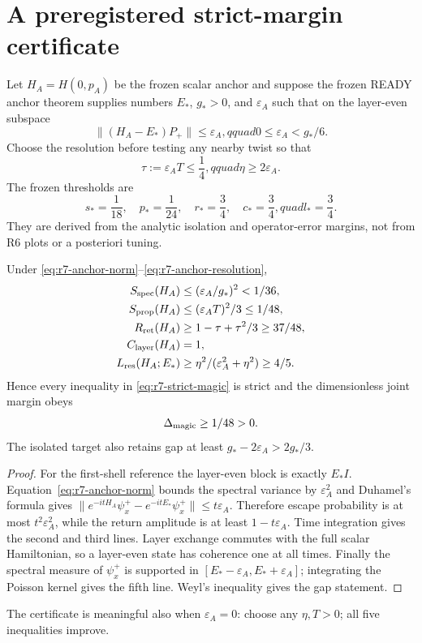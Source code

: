 \section{A preregistered strict-margin certificate}
\label{sec:r7-margin}

Let $H_A=H(0,p_A)$ be the frozen scalar anchor and suppose the frozen READY
anchor theorem supplies numbers $E_*$, $g_*>0$, and $\varepsilon_A$ such that
on the layer-even subspace
\begin{equation}
 \|(H_A-E_*)P_+\|\le\varepsilon_A,qquad
 0\le\varepsilon_A<g_*/6.
 \label{eq:r7-anchor-norm}
\end{equation}
Choose the resolution before testing any nearby twist so that
\begin{equation}
 \tau:=\varepsilon_A T\le\frac14,qquad
 \eta\ge2\varepsilon_A.
 \label{eq:r7-anchor-resolution}
\end{equation}
The frozen thresholds are
\begin{equation}
 s_*=\frac1{18},\quad p_*=\frac1{24},\quad r_*=\frac34,
 \quad c_*=\frac34,quad l_*=\frac34.
 \label{eq:r7-thresholds}
\end{equation}
They are derived from the analytic isolation and operator-error margins, not
from R6 plots or a posteriori tuning.

\begin{proposition}
\label{prop:r7-anchor-margin}
Under \eqref{eq:r7-anchor-norm}--\eqref{eq:r7-anchor-resolution},
\begin{align}
 S_{\rm spec}(H_A)&\le(\varepsilon_A/g_*)^2<1/36,\\
 S_{\rm prop}(H_A)&\le(\varepsilon_AT)^2/3\le1/48,\\
 R_{\rm ret}(H_A)&\ge1-\tau+\tau^2/3\ge37/48,\\
 C_{\rm layer}(H_A)&=1,\\
 L_{\rm res}(H_A;E_*)&\ge
 \eta^2/(\varepsilon_A^2+\eta^2)\ge4/5.
 \label{eq:r7-anchor-five}
\end{align}
Hence every inequality in \eqref{eq:r7-strict-magic} is strict and the
dimensionless joint margin obeys
\begin{equation}\Delta_{\rm magic}\ge1/48>0.\label{eq:r7-margin}\end{equation}
The isolated target also retains gap at least $g_*-2\varepsilon_A>2g_*/3$.
\end{proposition}

\begin{proof}
For the first-shell reference the layer-even block is exactly $E_*I$.
Equation~\eqref{eq:r7-anchor-norm} bounds the spectral variance by
$\varepsilon_A^2$ and Duhamel's formula gives
$\|e^{-itH_A}\psi_x^+-e^{-itE_*}\psi_x^+\|
\le t\varepsilon_A$.  Therefore escape probability is at most
$t^2\varepsilon_A^2$, while the return amplitude is at least
$1-t\varepsilon_A$.  Time integration gives the second and third lines.
Layer exchange commutes with the full scalar Hamiltonian, so a layer-even
state has coherence one at all times.  Finally the spectral measure of
$\psi_x^+$ is supported in $[E_*-\varepsilon_A,E_*+\varepsilon_A]$; integrating
the Poisson kernel gives the fifth line.  Weyl's inequality gives the gap
statement.
\end{proof}

The certificate is meaningful also when $\varepsilon_A=0$: choose any
$\eta,T>0$; all five inequalities improve.
